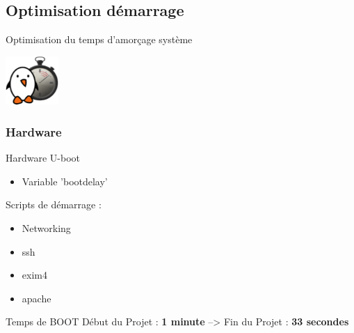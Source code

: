 \documentclass[11pt]{beamer}
\begin{document}
	\subsection{Optimisation démarrage}

	\begin{frame}{Optimisation du temps d'amorçage système}
	\begin{center}
	 \includegraphics[width=2cm]{common/boottime.png}
	\end{center}
	\end{frame}
	
	\subsubsection{Hardware}
	\begin{frame}[label=optimisation]{Hardware}
	U-boot
	\begin{itemize}
			\item Variable 'bootdelay'
	\end{itemize}
	Scripts de démarrage : \hyperlink{bootchart}{}\\
	\begin{itemize}
			\item Networking
			\item ssh
			\item exim4
			\item apache
	\end{itemize}
	\begin{block}{Temps de BOOT}
	 \centering Début du Projet : \textbf{1 minute} --> Fin du Projet : \textbf{33 secondes}
	 \end{block}	
	\end{frame}
\end{document}
